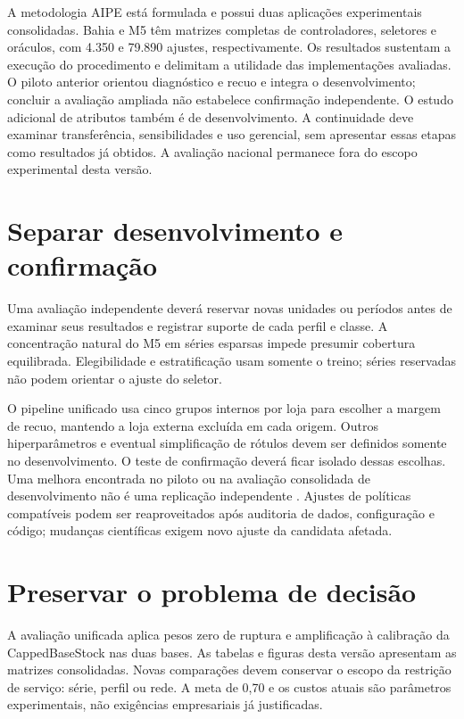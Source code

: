 
A metodologia AIPE está formulada e possui duas aplicações experimentais consolidadas. Bahia e M5 têm matrizes completas de controladores, seletores e oráculos, com 4.350 e 79.890 ajustes, respectivamente. Os resultados sustentam a execução do procedimento e delimitam a utilidade das implementações avaliadas. O piloto anterior orientou diagnóstico e recuo e integra o desenvolvimento; concluir a avaliação ampliada não estabelece confirmação independente. O estudo adicional de atributos também é de desenvolvimento. A continuidade deve examinar transferência, sensibilidades e uso gerencial, sem apresentar essas etapas como resultados já obtidos. A avaliação nacional permanece fora do escopo experimental desta versão.

\section{Separar desenvolvimento e confirmação}
\label{sec:estudos_caso_adicionais}
Uma avaliação independente deverá reservar novas unidades ou períodos antes de examinar seus resultados e registrar suporte de cada perfil e classe. A concentração natural do M5 em séries esparsas impede presumir cobertura equilibrada. Elegibilidade e estratificação usam somente o treino; séries reservadas não podem orientar o ajuste do seletor.

O pipeline unificado usa cinco grupos internos por loja para escolher a margem de recuo, mantendo a loja externa excluída em cada origem. Outros hiperparâmetros e eventual simplificação de rótulos devem ser definidos somente no desenvolvimento. O teste de confirmação deverá ficar isolado dessas escolhas. Uma melhora encontrada no piloto ou na avaliação consolidada de desenvolvimento não é uma replicação independente \citep{CawleyTalbot2010}. Ajustes de políticas compatíveis podem ser reaproveitados após auditoria de dados, configuração e código; mudanças científicas exigem novo ajuste da candidata afetada.

\section{Preservar o problema de decisão}
A avaliação unificada aplica pesos zero de ruptura e amplificação à calibração da CappedBaseStock nas duas bases. As tabelas e figuras desta versão apresentam as matrizes consolidadas. Novas comparações devem conservar o escopo da restrição de serviço: série, perfil ou rede. A meta de 0,70 e os custos atuais são parâmetros experimentais, não exigências empresariais já justificadas.

